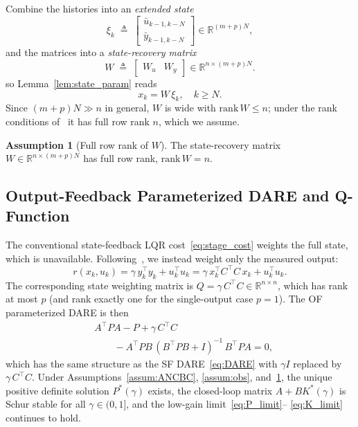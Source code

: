 \documentclass[final,5p,times,authoryear]{elsarticle}
\theoremstyle{plain}
\theoremstyle{definition}
\newtheorem{assumption}{Assumption}
\theoremstyle{remark}
\begin{document}
Combine the histories into an \emph{extended state}
\begin{equation}
\xi_k \;\triangleq\;
   \begin{bmatrix} \bar u_{k-1, k-N} \\[2pt] \bar y_{k-1, k-N} \end{bmatrix}
   \in \mathbb{R}^{(m+p)N},
\label{eq:xi_def}
\end{equation}
and the matrices into a \emph{state-recovery matrix}
\begin{equation}
W \;\triangleq\;
   \begin{bmatrix} W_u & W_y \end{bmatrix}
   \in \mathbb{R}^{n \times (m+p)N}.
\label{eq:W_def}
\end{equation}
so Lemma~\ref{lem:state_param} reads
\begin{equation}
x_k = W\,\xi_k, \quad k \geq N.
\label{eq:state_param_compact}
\end{equation}
Since $(m+p)N \gg n$ in general, $W$ is wide with
$\mathrm{rank}\,W \leq n$; under the rank conditions
of~{\citep[Theorems~2.3, 2.4]{RizviLin2023book}} it has full row rank
$n$, which we assume.

\begin{assumption}[Full row rank of $W$]\label{assum:W_rank}
The state-recovery matrix $W \in \mathbb{R}^{n \times (m+p)N}$ has full row
rank, $\mathrm{rank}\,W = n$.
\end{assumption}

\subsection{Output-Feedback Parameterized DARE and Q-Function}
\label{sec:of_q}

The conventional state-feedback LQR cost~\eqref{eq:stage_cost} weights
the full state, which is unavailable.  Following~\citep{RizviLin2023book},
we instead weight only the measured output:
\begin{equation}
r(x_k, u_k)
   = \gamma\,y_k^{\!\top}\!y_k + u_k^{\!\top}\!u_k
   = \gamma\,x_k^{\!\top} C^{\!\top}\!C\,x_k + u_k^{\!\top}\!u_k.
\label{eq:of_stage_cost}
\end{equation}
The corresponding state weighting matrix is
$Q = \gamma\,C^{\!\top}\!C \in \mathbb{R}^{n \times n}$, which has rank at most
$p$ (and rank exactly one for the single-output case $p = 1$).  The OF
parameterized DARE is then
\begin{equation}
\begin{aligned}
&A^{\!\top}\!P A - P + \gamma\,C^{\!\top}\!C \\
&\qquad - A^{\!\top}\!PB\,(B^{\!\top}\!PB + I)^{-1}\,B^{\!\top}\!PA = 0,
\end{aligned}
\label{eq:of_dare}
\end{equation}
which has the same structure as the SF DARE~\eqref{eq:DARE} with
$\gamma I$ replaced by $\gamma\,C^{\!\top}\!C$.  Under
Assumptions~\ref{assum:ANCBC}, \ref{assum:obs}, and~\ref{assum:W_rank},
the unique positive definite solution $P^{*}(\gamma)$ exists, the
closed-loop matrix $A + B K^{*}(\gamma)$ is Schur stable for all
$\gamma \in (0, 1]$, and the low-gain limit~\eqref{eq:P_limit}--%
\eqref{eq:K_limit} continues to hold.
\end{document}
